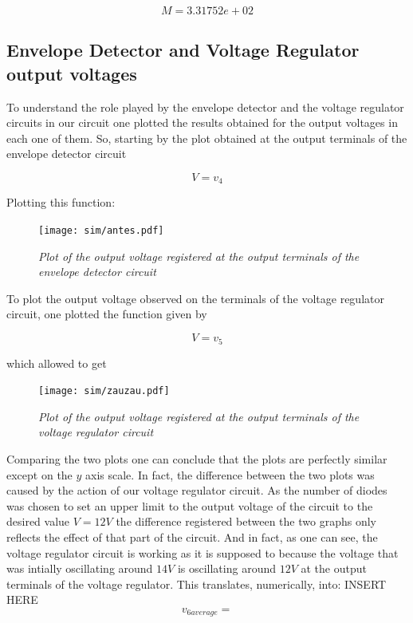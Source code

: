 \begin{equation}
    M = 3.31752e+02
\end{equation}

\subsection{Envelope Detector and Voltage Regulator output voltages}
To understand the role played by the envelope detector and the voltage regulator circuits in our circuit one plotted the results obtained for the output voltages in each one of them. So, starting by the plot obtained at the output terminals of the envelope detector circuit

\begin{equation}
    V = v_4
\end{equation}

Plotting this function:

\vspace{-140px}
\begin{figure}[H]
    \centering
    \texttt{[image: sim/antes.pdf]}
    \vspace*{-10mm}
        \caption{\textit{Plot of the output voltage registered at the output terminals of the envelope detector circuit}}
    \label{fig:before}
\end{figure}

To plot the output voltage observed on the terminals of the voltage regulator circuit, one plotted the function given by

\begin{equation}
    V = v_5
\end{equation}

which allowed to get

\vspace{-140px}
\begin{figure}[H]
    \centering
    \texttt{[image: sim/zauzau.pdf]}
    \vspace*{-10mm}
        \caption{\textit{Plot of the output voltage registered at the output terminals of the voltage regulator circuit}}
    \label{fig:zauzau}
\end{figure}

Comparing the two plots one can conclude that the plots are perfectly similar except on the $y$ axis scale. In fact, the difference between the two plots was caused by the action of our voltage regulator circuit. As the number of diodes was chosen to set an upper limit to the output voltage of the circuit to the desired value $V = 12V$ the difference registered between the two graphs only reflects the effect of that part of the circuit. And in fact, as one can see, the voltage regulator circuit is working as it is supposed to because the voltage that was intially oscillating around $14V$ is oscillating around $12V$ at the output terminals of the voltage regulator. This translates, numerically, into: INSERT HERE
\begin{equation}
    v_{6 average} = 
\end{equation}

